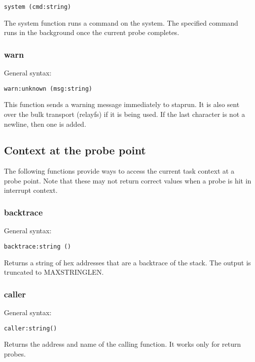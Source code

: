 \documentclass[twoside,english]{article}
\newenvironment{vindent}
{\begin{list}{}{\setlength{\listparindent}{6pt}}
\item[]}
{\end{list}}
\begin{document}
\begin{vindent}
\begin{verbatim}
system (cmd:string)
\end{verbatim}
\end{vindent}
The system function runs a command on the system. The specified command runs
in the background once the current probe completes.


\subsubsection{warn}
General syntax:

\begin{vindent}
\begin{verbatim}
warn:unknown (msg:string)
\end{verbatim}
\end{vindent}
This function sends a warning message immediately to staprun. It is also
sent over the bulk transport (relayfs) if it is being used. If the last character
is not a newline, then one is added.

\subsection{Context at the probe point}

The following functions provide ways to access the current task context
at a probe point. Note that these may not return correct values when
a probe is hit in interrupt context.

\subsubsection{backtrace}
General syntax:

\begin{vindent}
\begin{verbatim}
backtrace:string ()
\end{verbatim}
\end{vindent}
Returns a string of hex addresses that are a backtrace of the
stack. The output is truncated to MAXSTRINGLEN.

\subsubsection{caller}
General syntax:

\begin{vindent}
\begin{verbatim}
caller:string()
\end{verbatim}
\end{vindent}
Returns the address and name of the calling function. It works
only for return probes.
\end{document}
